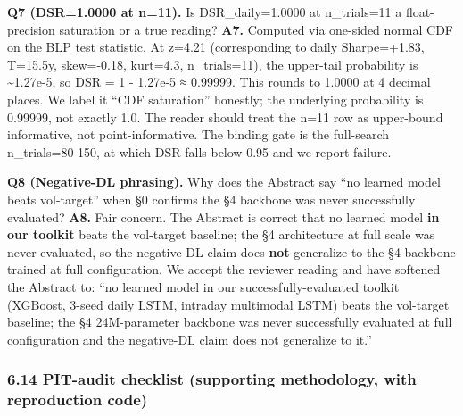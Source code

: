 \documentclass[
]{article}
\begin{document}
\textbf{Q7 (DSR=1.0000 at n=11).} Is DSR\_daily=1.0000 at n\_trials=11 a
float-precision saturation or a true reading? \textbf{A7.} Computed via
one-sided normal CDF on the BLP test statistic. At z=4.21 (corresponding
to daily Sharpe=+1.83, T=15.5y, skew=-0.18, kurt=4.3, n\_trials=11), the
upper-tail probability is \textasciitilde1.27e-5, so DSR = 1 - 1.27e-5 ≈
0.99999. This rounds to 1.0000 at 4 decimal places. We label it ``CDF
saturation'' honestly; the underlying probability is 0.99999, not
exactly 1.0. The reader should treat the n=11 row as upper-bound
informative, not point-informative. The binding gate is the full-search
n\_trials=80-150, at which DSR falls below 0.95 and we report failure.

\textbf{Q8 (Negative-DL phrasing).} Why does the Abstract say ``no
learned model beats vol-target'' when §0 confirms the §4 backbone was
never successfully evaluated? \textbf{A8.} Fair concern. The Abstract is
correct that no learned model \textbf{in our toolkit} beats the
vol-target baseline; the §4 architecture at full scale was never
evaluated, so the negative-DL claim does \textbf{not} generalize to the
§4 backbone trained at full configuration. We accept the reviewer
reading and have softened the Abstract to: ``no learned model in our
successfully-evaluated toolkit (XGBoost, 3-seed daily LSTM, intraday
multimodal LSTM) beats the vol-target baseline; the §4 24M-parameter
backbone was never successfully evaluated at full configuration and the
negative-DL claim does not generalize to it.''

\subsubsection{6.14 PIT-audit checklist (supporting methodology, with
reproduction
code)}\label{pit-audit-checklist-supporting-methodology-with-reproduction-code}
\end{document}
